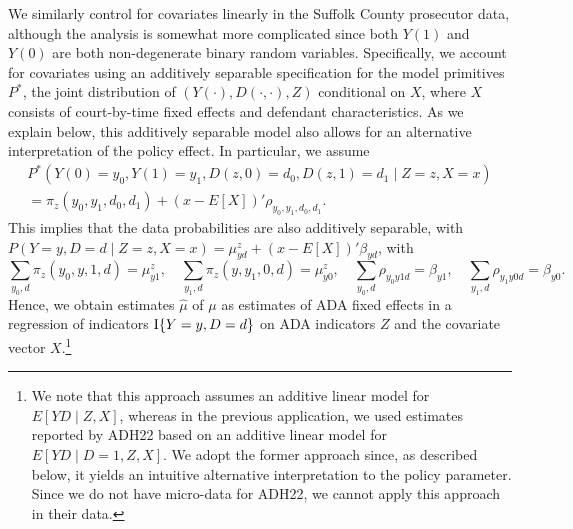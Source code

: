 \documentclass[12pt]{article}%
\theoremstyle{definition}
\newcommand\1{\operatorname{I}\indicatorfence}
\begin{document}
\begin{appendices}
%
%
%
%
%
%
%
%
%
%

We similarly control for covariates linearly in the Suffolk County prosecutor data, although the analysis is somewhat more complicated since both $Y(1)$ and $Y(0)$ are both non-degenerate binary random variables. Specifically, we account for covariates using an
additively separable specification for the model primitives $P^{*}$, the
joint distribution of $(Y(\cdot), D(\cdot, \cdot), Z)$ conditional on $X$, where
$X$ consists of court-by-time fixed effects and defendant characteristics. As we
explain below, this additively separable model also allows for an alternative interpretation
of the policy effect. In particular, we assume
\begin{multline}\label{eq:linear-separable}
  P^{*}(Y(0)=y_{0}, Y(1)=y_{1}, D(z,0)=d_{0}, D(z,1)=d_{1}\mid Z=z, X=x)\\
  =
  \pi_{z}(y_{0}, y_{1}, d_{0}, d_{1})+(x-E[X])'\rho_{y_{0}, y_{1}, d_{0}, d_{1}}.
\end{multline}
This implies that the data probabilities are also additively separable, with
$P(Y=y, D=d\mid Z=z, X=x)=\mu_{yd}^z+(x-E[X])'\beta_{yd}$, with
\begin{equation}\label{eq:data_comp_x}
  \sum_{y_{0}, d}\pi_z(y_{0}, y, 1, d)=\mu_{y 1}^z, \quad
  \sum_{y_{1}, d}\pi_z(y, y_{1}, 0, d)=\mu_{y 0}^z, \quad
  \sum_{y_{0}, d}\rho_{y_{0} y 1 d}=\beta_{y 1}, \quad
  \sum_{y_{1}, d}\rho_{y_{1} y 0 d}=\beta_{y 0}.
\end{equation}
Hence, we obtain estimates $\hat{\mu}$ of $\mu$ as estimates of ADA fixed
effects in a regression of indicators $\1{Y=y, D=d}$ on ADA indicators $Z$ and
the covariate vector $X$.\footnote{We note that this approach assumes an additive linear model for $E[YD \mid Z,X]$, whereas in the previous application, we used estimates reported by ADH22 based on an additive linear model for $E[Y D \mid D=1,Z,X]$. We adopt the former approach since, as described below, it yields an intuitive alternative interpretation to the policy parameter. Since we do not have micro-data for ADH22, we cannot apply this approach in their data.}


\end{appendices}
\end{document}
